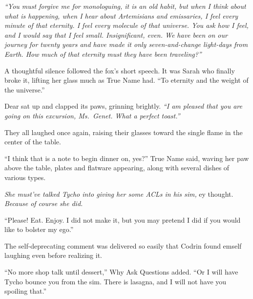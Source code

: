 \emph{``You must forgive me for monologuing, it is an old habit, but when I think about what is happening, when I hear about Artemisians and emissaries, I feel every minute of that eternity. I feel every molecule of that universe. You ask how I feel, and I would say that I feel small. Insignificant, even. We have been on our journey for twenty years and have made it only seven-and-change light-days from Earth. How much of that eternity must they have been traveling?''}

A thoughtful silence followed the fox's short speech. It was Sarah who finally broke it, lifting her glass much as True Name had. ``To eternity and the weight of the universe.''

Dear sat up and clapped its paws, grinning brightly. \emph{``I am pleased that you are going on this excursion, Ms.~Genet. What a perfect toast.''}

They all laughed once again, raising their glasses toward the single flame in the center of the table.

``I think that is a note to begin dinner on, yes?'' True Name said, waving her paw above the table, plates and flatware appearing, along with several dishes of various types.

\emph{She must've talked Tycho into giving her some ACLs in his sim,} ey thought. \emph{Because of course she did.}

``Please! Eat. Enjoy. I did not make it, but you may pretend I did if you would like to bolster my ego.''

The self-deprecating comment was delivered so easily that Codrin found emself laughing even before realizing it.

``No more shop talk until dessert,'' Why Ask Questions added. ``Or I will have Tycho bounce you from the sim. There is lasagna, and I will not have you spoiling that.''
